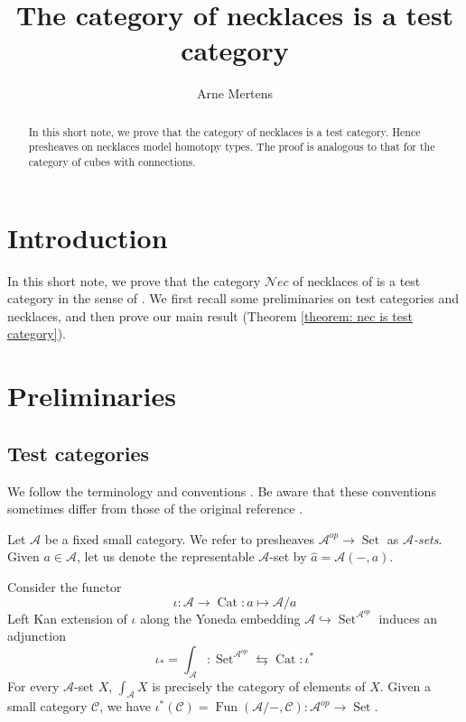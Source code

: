 \documentclass[12pt,a4paper,reqno]{amsart}
\title{The category of necklaces is a test category}
\author{Arne Mertens}
\DeclareMathOperator{\Fun}{Fun}
\DeclareMathOperator{\Set}{Set}
\DeclareMathOperator{\Cat}{Cat}
\newcommand{\nec}{\mathcal{N}ec} %
\theoremstyle{definition}
\theoremstyle{remark}
\begin{document}
\begin{abstract}
In this short note, we prove that the category of necklaces is a test category. Hence presheaves on necklaces model homotopy types. The proof is analogous to that for the category of cubes with connections.
\end{abstract}

\maketitle


\section{Introduction}

In this short note, we prove that the category $\nec$ of necklaces of \cite{dugger2011rigidification} is a test category in the sense of \cite{cisinski2006prefaisceaux}. We first recall some preliminaries on test categories and necklaces, and then prove our main result (Theorem \ref{theorem: nec is test category}).

\section{Preliminaries}

\subsection{Test categories}

We follow the terminology and conventions \cite{jardine2006categorical}. Be aware that these conventions sometimes differ from those of the original reference \cite{cisinski2006prefaisceaux}.

Let $\mathcal{A}$ be a fixed small category. We refer to presheaves $\mathcal{A}^{op}\to \Set$ as \emph{$\mathcal{A}$-sets}. Given $a\in \mathcal{A}$, let us denote the representable $\mathcal{A}$-set by $\hat{a} = \mathcal{A}(-,a)$.

Consider the functor
\begin{equation}\label{diagram: slice functor}
\iota: \mathcal{A}\rightarrow \Cat: a\mapsto \mathcal{A}/a
\end{equation}
Left Kan extension of $\iota$ along the Yoneda embedding $\mathcal{A}\hookrightarrow \Set^{\mathcal{A}^{op}}$ induces an adjunction
$$
\iota_{*} = \int_{\mathcal{A}}: \Set^{\mathcal{A}^{op}}\leftrightarrows \Cat: \iota^{*}
$$
For every $\mathcal{A}$-set $X$, $\int_{\mathcal{A}}X$ is precisely the category of elements of $X$. Given a small category $\mathcal{C}$, we have $\iota^{*}(\mathcal{C}) = \Fun(\mathcal{A}/-,\mathcal{C}): \mathcal{A}^{op}\to \Set$.
\end{document}
